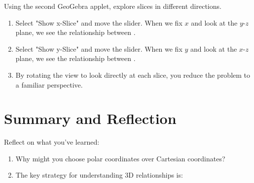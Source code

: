 \documentclass{ximera}
\begin{document}
\begin{problem}
    Using the second GeoGebra applet, explore slices in different directions.
    
    \begin{enumerate}
        \item Select "Show x-Slice" and move the slider. When we fix $x$ and look at the $y$-$z$ plane, we see the relationship between .
        
        \item Select "Show y-Slice" and move the slider. When we fix $y$ and look at the $x$-$z$ plane, we see the relationship between .
        
        \item By rotating the view to look directly at each slice, you reduce the problem to a familiar  perspective.
    \end{enumerate}
\end{problem}

\section*{Summary and Reflection}

\begin{problem}
    Reflect on what you've learned:
    
    \begin{enumerate}
        \item Why might you choose polar coordinates over Cartesian coordinates?
        \begin{selectAll}
        \end{selectAll}
        
        \item The key strategy for understanding 3D relationships is:
        \begin{multipleChoice}
        \end{multipleChoice}
    \end{enumerate}
\end{problem}
\end{document}
